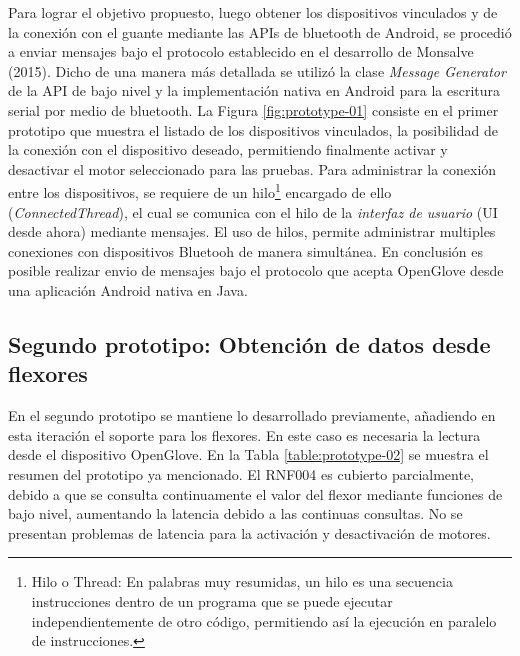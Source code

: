 Para lograr el objetivo propuesto, luego obtener los dispositivos vinculados y de la conexión con el guante mediante las APIs de bluetooth de Android, se procedió a enviar mensajes bajo el protocolo establecido en el desarrollo de Monsalve (2015). Dicho de una manera más detallada se utilizó la clase \textit{Message Generator} de la API de bajo nivel y la implementación nativa en Android para la escritura serial por medio de bluetooth. La Figura \ref{fig:prototype-01} consiste en el primer prototipo que muestra el listado de los dispositivos vinculados, la posibilidad de la conexión con el dispositivo deseado, permitiendo finalmente activar y desactivar el motor seleccionado para las pruebas. Para administrar la conexión entre los dispositivos, se requiere de un hilo\footnote{Hilo o Thread: En palabras muy resumidas, un hilo es una secuencia instrucciones dentro de un programa que se puede ejecutar independientemente de otro código, permitiendo así la ejecución en paralelo de instrucciones.} encargado de ello (\textit{ConnectedThread}), el cual se comunica con el hilo de la \textit{interfaz de usuario} (UI desde ahora)  mediante mensajes. El uso de hilos, permite administrar multiples conexiones con dispositivos Bluetooh de manera simultánea. En conclusión es posible realizar envio de mensajes bajo el protocolo que acepta OpenGlove desde una aplicación Android nativa en Java.





\subsection{Segundo prototipo: Obtención de datos desde flexores}
\label{segundo-prototipo}
En el segundo prototipo se mantiene lo desarrollado previamente, añadiendo en esta iteración el soporte para los flexores. En este caso es necesaria la lectura desde el dispositivo OpenGlove. En la Tabla \ref{table:prototype-02} se muestra el resumen del prototipo ya mencionado. El RNF004 es cubierto parcialmente, debido a que se consulta continuamente el valor del flexor mediante funciones de bajo nivel, aumentando la latencia debido a las continuas consultas. No se presentan problemas de latencia para la activación y desactivación de motores.



